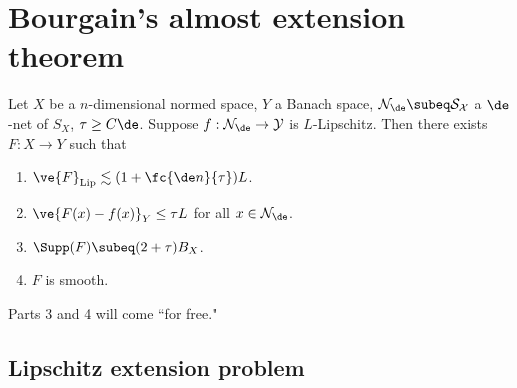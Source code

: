 

\section{Bourgain's almost extension theorem}
%
\begin{thm} 
\label{thm:baet}
Let $X$ be a $n$-dimensional normed space, $Y$ a Banach space, $\cal N_\de\subeq S_X$ a $\de$-net of $S_X$, $\tau\ge C\de$. Suppose $f:\cal N_\de\to Y$ is $L$-Lipschitz. Then there exists $F:X\to Y$ such that 
\begin{enumerate}
\item $\ve{F}_{\text{Lip}} \lesssim (1+\fc{\de n}{\tau}) L$.
\item $\ve{F(x)-f(x)}_Y\le \tau L$ for all $x\in \cal N_\de$. 
\item $\Supp(F) \subeq (2+\tau)B_X$.
\item $F$ is smooth.
\end{enumerate} %
\end{thm}
Parts 3 and 4 will come ``for free."
\subsection{Lipschitz extension problem}

